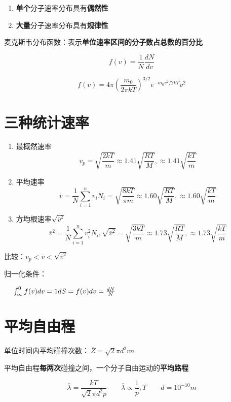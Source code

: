 \begin{enumerate}
    \item \textbf{单个}分子速率分布具有\textbf{偶然性}
    \item \textbf{大量}分子速率分布具有\textbf{规律性}
\end{enumerate}

麦克斯韦分布函数：表示\textbf{单位速率区间的分子数占总数的百分比}

\begin{equation}
    f(v)=\frac{1}{N}\frac{dN}{dv}
\end{equation}

\begin{equation}
    f(v)=4\pi \left(\frac{m_0}{2\pi kT}\right)^{3/2}e^{-m_0v^2/2kT}v^2
\end{equation}

\section{三种统计速率}

\begin{enumerate}

    \item 最概然速率
          \begin{equation}
              v_p=\sqrt{\frac{2kT}{m}}\approx 1.41\sqrt{\frac{RT}{M}},\approx 1.41\sqrt{\frac{kT}{m}}
          \end{equation}

    \item 平均速率
          \begin{equation}
              \overline {v}=\frac{1}{N}\sum_{i=1}^n{v_iN_i}=\sqrt{\frac{8kT}{\pi m}}\approx 1.60\sqrt{\frac{RT}{M}},\approx 1.60\sqrt{\frac{kT}{m}}
          \end{equation}

    \item 方均根速率$\sqrt{\overline{v}^2}$
          \begin{equation}
              \overline{v}^2=\frac{1}{N}\sum_{i=1}^n{v_i^2N_i},\sqrt{\overline{v}^2}=\sqrt{\frac{3kT}{m}}\approx 1.73\sqrt{\frac{RT}{M}},\approx 1.73\sqrt{\frac{kT}{m}}
          \end{equation}

\end{enumerate}

比较：$v_p<\overline{v}<\sqrt{\overline{v}^2}$

归一化条件：

$\hspace{3ex} \int^{0}_{\infty}{f(v)dv}=1\\dS=f(v)dv=\frac{dN}{N}$

\section{平均自由程}

单位时间内平均碰撞次数：$~\overline{Z}=\sqrt{2}\pi{}d^2vn$

平均自由程\textbf{每两次}碰撞之间，一个分子自由运动的\textbf{平均路程}

\begin{equation}
    \overline{\lambda}=\frac{kT}{\sqrt{2}\pi{}d^2p}\qquad\overline{\lambda{}}\propto\frac{1}{p},T\qquad d=10^{-10}m
\end{equation}

\newpage